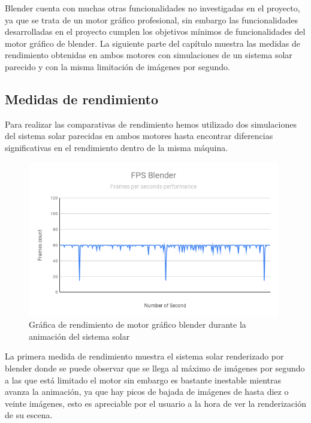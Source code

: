 \documentclass[a4paper]{book}
\begin{document}
Blender cuenta con muchas otras funcionalidades no investigadas en el proyecto, ya que se trata de un motor gráfico profesional,
sin embargo las funcionalidades desarrolladas en el proyecto cumplen los objetivos mínimos de funcionalidades del motor gráfico de blender. La
siguiente parte del capítulo muestra las medidas de rendimiento obtenidas en ambos motores con simulaciones de un sistema solar
parecido y con la misma limitación de imágenes por segundo.

\subsection{Medidas de rendimiento}

Para realizar las comparativas de rendimiento hemos utilizado dos simulaciones del sistema solar parecidas en ambos motores hasta
encontrar diferencias significativas en el rendimiento  dentro de la misma máquina.

\begin{figure}[H]
    \centering
    \includegraphics[width=11cm, keepaspectratio]{img/FPSBlender.png}
    \caption{Gráfica de rendimiento de motor gráfico blender durante la animación del sistema solar}
    \label{FPSBlender}
\end{figure}

La primera medida de rendimiento muestra el sistema solar renderizado por blender donde se puede observar que se llega al máximo de
imágenes por segundo a las que está limitado el motor sin embargo es bastante inestable mientras avanza la animación, ya que hay
picos de bajada de imágenes de hasta diez o veinte imágenes, esto es apreciable por el usuario a la hora de ver la renderización
de su escena.
\end{document}
